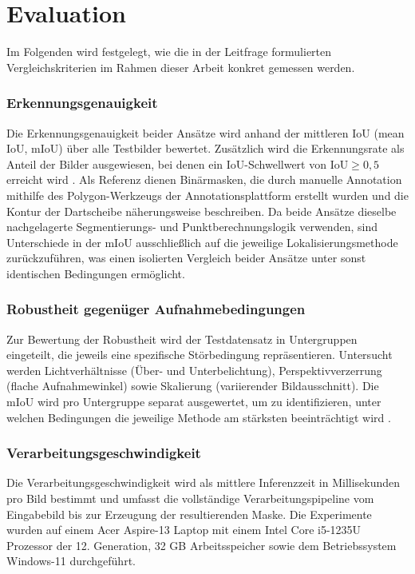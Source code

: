 \section{Evaluation}

Im Folgenden wird festgelegt, wie die in der Leitfrage formulierten Vergleichskriterien im Rahmen dieser Arbeit konkret gemessen werden.

\subsubsection{Erkennungsgenauigkeit}

Die Erkennungsgenauigkeit beider Ansätze wird anhand der mittleren IoU (mean IoU, mIoU) über alle Testbilder bewertet. Zusätzlich wird die Erkennungsrate als Anteil der Bilder ausgewiesen, bei denen ein IoU-Schwellwert von $\text{IoU} \geq 0{,}5$ erreicht wird \cite{everingham2010pascal}. Als Referenz dienen Binärmasken, die durch manuelle Annotation mithilfe des Polygon-Werkzeugs der Annotationsplattform \cite{roboflow2024} erstellt wurden und die Kontur der Dartscheibe näherungsweise beschreiben. Da beide Ansätze dieselbe nachgelagerte Segmentierungs- und Punktberechnungslogik verwenden, sind Unterschiede in der mIoU ausschließlich auf die jeweilige Lokalisierungsmethode zurückzuführen, was einen isolierten Vergleich beider Ansätze unter sonst identischen Bedingungen ermöglicht.

\subsubsection{Robustheit gegenüger Aufnahmebedingungen}

Zur Bewertung der Robustheit wird der Testdatensatz in Untergruppen eingeteilt, die jeweils eine spezifische Störbedingung repräsentieren. Untersucht werden Lichtverhältnisse (Über- und Unterbelichtung), Perspektivverzerrung (flache Aufnahmewinkel) sowie Skalierung (variierender Bildausschnitt). Die mIoU wird pro Untergruppe separat ausgewertet, um zu identifizieren, unter welchen Bedingungen die jeweilige Methode am stärksten beeinträchtigt wird \cite{szeliski_computer_2022}.

\subsubsection{Verarbeitungsgeschwindigkeit}

Die Verarbeitungsgeschwindigkeit wird als mittlere Inferenzzeit in Millisekunden pro Bild bestimmt und umfasst die vollständige Verarbeitungspipeline vom Eingabebild bis zur Erzeugung der resultierenden Maske. Die Experimente wurden auf einem Acer Aspire-13 Laptop mit einem Intel Core i5-1235U Prozessor der 12. Generation, 32 GB Arbeitsspeicher sowie dem Betriebssystem Windows-11 durchgeführt. 

